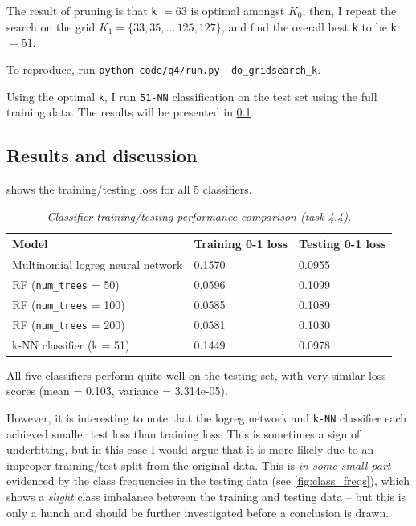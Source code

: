 The result of pruning is that \texttt{k} $= 63$ is optimal amongst $K_0$; then,
I repeat the search on the grid $K_1 = \{33, 35, \dots\, 125, 127\}$, and find
the overall best \texttt{k} to be \texttt{k} $= 51$.

To reproduce, run \texttt{python code/q4/run.py --do\_gridsearch\_k}.

Using the optimal \texttt{k}, I run \texttt{51-NN} classification on the test
set using the full training data. The results will be presented in
\cref{sec:classifier_results}.

\subsection{Results and discussion}
\label{sec:classifier_results}

 shows the training/testing loss for all 5
classifiers.

\begin{table}[H] \centering
  \begin{tabular}{|l|l|l|}
    \hline
\textbf{Model}                    & \textbf{Training 0-1 loss} & \textbf{Testing 0-1 loss}\\\hline\hline
Multinomial logreg neural network & 0.1570                     & 0.0955  \\\hline
RF (\texttt{num\_trees} = 50)     & 0.0596                     & 0.1099  \\\hline
RF (\texttt{num\_trees} = 100)    & 0.0585                     & 0.1089  \\\hline
RF (\texttt{num\_trees} = 200)    & 0.0581                     & 0.1030  \\\hline
k-NN classifier (k = 51)          & 0.1449                     & 0.0978  \\\hline
\end{tabular}
  \caption{\textit{Classifier training/testing performance comparison (task 4.4).}}
  \label{table:classifier_results}
\end{table}

All five classifiers perform quite well on the testing set, with very similar
loss scores (mean = 0.103, variance = 3.314e-05).

However, it is interesting to note that the logreg network and \texttt{k-NN}
classifier each achieved smaller test loss than training loss. This is sometimes
a sign of underfitting, but in this case I would argue that it is more likely
due to an improper training/test split from the original data. This is
\textit{in some small part} evidenced by the class frequencies in the testing
data (see \cref{fig:class_freqs}), which shows a \textit{slight} class imbalance
between the training and testing data -- but this is only a hunch and should be
further investigated before a conclusion is drawn.

